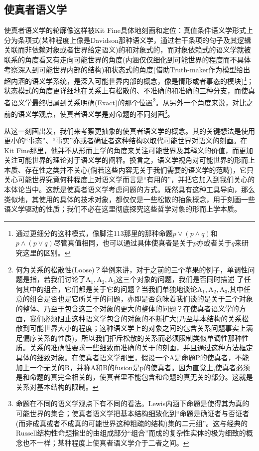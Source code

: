 \documentclass{article}
\begin{document}
\subsection{使真者语义学}
使真者语义学的轮廓像这样被Kit Fine具体地刻画和定位：真值条件语义学形式上分为条项式(某种程度上像是Davidson那种语义学，通过若干条项的句子及其逻辑关联而非依赖对象或者世界给定语义)的和对象式的，而对象依赖式的语义学就被联系的角度看又有走向可能世界的角度(内涵仅仅细化到可能世界的程度而不具体考察深入到可能世界内部的结构)和状态式的角度(借助Truth-maker作为模型给出超内涵的语义学系统，是深入可能世界内部的概念，像是情形或者事态的模块)\footnote{通过更细分的这种模式，像脚注113那里的那种命题$p\lor(p\land q)$和$p\land(p \lor q)$尽管真值相同，也可以通过具体使真者是关于$p$亦或者关于$q$来研究这里的区别。}；状态模式的角度更详细地在关系上有松散的、不准确的和准确的三种分支，而使真者语义学最终归属到关系明确(Exact)的那个位置\footnote{何为关系的松散性(Loose)？举例来讲，对于之前的三个苹果的例子，单调性问题是指，若我们讨论了$\mathrm{A_1,A_2,A_3}$这三个对象的问题，我们是否同时描述
了任何其中的组合，它们都是关于它的问题？当我们单独地谈论$\mathrm{A_1,A_2,A_3}$,其中任意的组合是否也是它所关于的问题，亦即是否意味着我们谈的是关于三个对象的整体、乃至于包含这三个对象的更大的整体的问题？在使真者语义学的方面，我们必须阻止这种语义学包含的对象的不断扩大(乃至基本结构的关系松散到可能世界大小的程度；这种语义学上的对象之间的包含关系问题事实上满足偏序关系的性质)，所以我们拒斥松散的关系而必须限制类似单调性那种性质。关系的准确性要求一些细致而准确的关于的刻画，并且通过这种方法框定具体的细致对象。在使真者语义学那里，假设一个A是命题P的使真者，不能加上一个无关的B，并称A和B的fusion是p的使真者。因为直觉上,使真者必须是和命题的真完全相关的，使真者里不能包含和命题的真无关的部分。这就是关系对基本结构的限制。}。从另外一个角度来说，对比之前的语义学观点，使真者语义学是对命题的不同刻画\footnote{命题在不同的语义学观点下有不同的看法。Lewis内涵下命题是使得其为真的可能世界的集合；使真者语义学把基本结构细致化到“命题是确证者与否证者(而非成真或者不成真的可能世界这种粗疏的结构)集的二元组”。这与经典的Russell结构性命题指出的由组成部分“组合”而成的复杂性实体的极为细致的概念也不一样；某种程度上使真者语义学介于二者之间。}。

从这一刻画出发，我们来考察更抽象的使真者语义学的概念。其的关键想法是使用更小的“事态”、“事实”亦或者确证者这种结构以取代可能世界对语义的刻画。在Kit Fine那里，他并不从形而上学的角度来关注可能世界及其释义的价值，而更加关注可能世界的理论对于语义学的阐释。换言之，语义学视角对可能世界的形而上本质、存在性之类并不关心(倘若这些内容无关于我们需要的语义学的范畴)，它只关心可能世界究竟何种程度上对语义学而言是“有用的”，并把它加入到我们关心的本体论当中。这就是使真者语义学考虑问题的方式。既然具有这种工具导向，那么类似地，其使用的具体的技术对象，都仅仅是一些松散的抽象概念，用于刻画一些语义学驱动的性质；我们不必在这里彻底探究这些哲学对象的形而上学本质。
\end{document}
